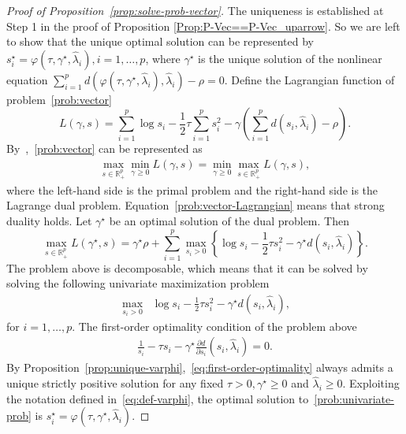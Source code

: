\documentclass[11pt]{article}
\def\R{\mathbb{R}}
\newcommand{\opt}{^\star}
\def\R{\mathbb{R}}
\begin{document}
\begin{proof}[Proof of Proposition~\ref{prop:solve-prob-vector}]
The uniqueness is established at Step 1 in the proof of Proposition \ref{Prop:P-Vec==P-Vec_uparrow}. 
  So we are left to 
  show that the unique optimal solution can be represented by 
  $s_i\opt=\varphi(\tau, \gamma\opt, \widehat{\lambda}_i),i=1,\ldots,p$, where $\gamma\opt$ is the unique solution of the nonlinear equation $\sum_{i=1}^p d(\varphi(\tau, \gamma\opt, \widehat{\lambda}_i), \widehat{\lambda}_i)- \rho=0$.
   Define the Lagrangian function of problem~\eqref{prob:vector}  
    \[
        L(\gamma, s) = \sum_{i=1}^p \log s_i - \frac{1}{2}\tau\sum_{i=1}^p s_i^2 -\gamma \left(\sum_{i=1}^p d(s_i,\widehat{\lambda}_i)- \rho\right).
    \]
  By~\citet[Theorem 28.3]{ref:Rockafellar1970},~\eqref{prob:vector} can be represented as
    \begin{align}
        \max_{s\in\R_+^p} \min_{\gamma \geq 0} L(\gamma, s) = \min_{\gamma \geq 0}\max_{s\in\R_+^p}  L(\gamma, s), \label{prob:vector-Lagrangian}
    \end{align}
    where the left-hand side is the primal problem and the right-hand side is the Lagrange dual problem.
    Equation~\eqref{prob:vector-Lagrangian} means that strong duality holds.  
Let $\gamma\opt$ be an optimal solution of the dual problem. Then
    \[
        \max_{s\in\R_+^p} L(\gamma\opt, s)= \gamma\opt \rho + \sum_{i=1}^p\max_{s_i>0}\left\{ \log s_i-\frac{1}{2}\tau s_i^2 - \gamma\opt d(s_i,\widehat{\lambda}_i)\right\}.
    \]
The problem above is decomposable, which means that it can be solved by solving the following univariate maximization problem 
    \begin{align}
        \max_{s_i>0}\;\; \log s_i-\frac{1}{2}\tau s_i^2 - \gamma\opt d(s_i,\widehat{\lambda}_i), \label{prob:univariate-prob}
    \end{align}
    for $i=1, \ldots ,p$.
    The first-order optimality condition of the problem above  
    \begin{align}
        \frac{1}{s_i}-\tau s_i-\gamma\opt\frac{\partial d}{\partial s_i}(s_i,\widehat{\lambda}_i)=0. \label{eq:first-order-optimality}
    \end{align}
    By Proposition~\ref{prop:unique-varphi},~\eqref{eq:first-order-optimality} always admits a unique strictly positive solution for 
    any 
    fixed $\tau>0,\gamma\opt\geq 0$ and $\widehat{\lambda}_i\geq 0$. Exploiting the notation defined in~\eqref{eq:def-varphi}, the optimal solution to~\eqref{prob:univariate-prob} is $s_i\opt=\varphi(\tau, \gamma\opt, \widehat{\lambda}_i)$.


\end{proof}
\end{document}
